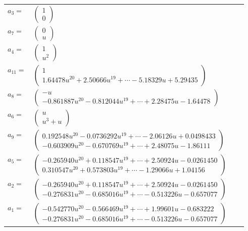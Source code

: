 \documentclass[1p]{elsarticle_modified}
\theoremstyle{definition}
\begin{document}
\begin{tabular}{m{7pt} m{180pt} m{7pt} m{180pt} }
\flushright $a_{3}=$&$\begin{pmatrix}1\\0\end{pmatrix}$ \\
\flushright $a_{7}=$&$\begin{pmatrix}0\\u\end{pmatrix}$ \\
\flushright $a_{4}=$&$\begin{pmatrix}1\\u^2\end{pmatrix}$ \\
\flushright $a_{11}=$&$\begin{pmatrix}1\\1.64478 u^{20}+2.50666 u^{19}+\cdots-5.18329 u+5.29435\end{pmatrix}$ \\
\flushright $a_{8}=$&$\begin{pmatrix}- u\\-0.861887 u^{20}-0.812044 u^{19}+\cdots+2.28475 u-1.64478\end{pmatrix}$ \\
\flushright $a_{6}=$&$\begin{pmatrix}u\\u^3+u\end{pmatrix}$ \\
\flushright $a_{9}=$&$\begin{pmatrix}0.192548 u^{20}-0.0736292 u^{19}+\cdots-2.06126 u+0.0498433\\-0.603909 u^{20}-0.670769 u^{19}+\cdots+2.48075 u-1.86111\end{pmatrix}$ \\
\flushright $a_{5}=$&$\begin{pmatrix}-0.265940 u^{20}+0.118547 u^{19}+\cdots+2.50924 u-0.0261450\\0.310547 u^{20}+0.573803 u^{19}+\cdots-1.29066 u+1.04156\end{pmatrix}$ \\
\flushright $a_{2}=$&$\begin{pmatrix}-0.265940 u^{20}+0.118547 u^{19}+\cdots+2.50924 u-0.0261450\\-0.276831 u^{20}-0.685016 u^{19}+\cdots-0.513226 u-0.657077\end{pmatrix}$ \\
\flushright $a_{1}=$&$\begin{pmatrix}-0.542770 u^{20}-0.566469 u^{19}+\cdots+1.99601 u-0.683222\\-0.276831 u^{20}-0.685016 u^{19}+\cdots-0.513226 u-0.657077\end{pmatrix}$ \\

\end{tabular}
\end{document}
